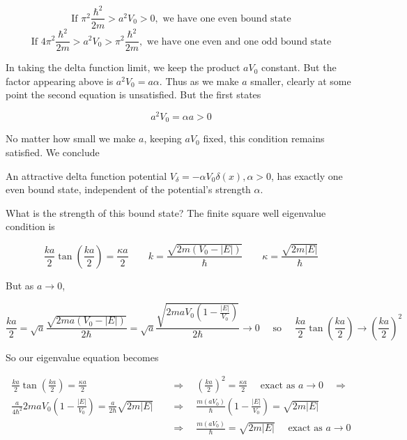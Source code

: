 \[ \text{If } \pi^2 \frac{\hbar^2}{2m} > a^2V_0 > 0, \text{ we have one even
bound state} \]
\[ \text{If } 4\pi^2\frac{\hbar^2}{2m} > a^2V_0 > \pi^2\frac{\hbar^2}{2m},
  \text{ we have one even and one odd bound state} \] \vspace{3px}

In taking the delta function limit, we keep the product $aV_0$ constant. But
the factor appearing above is $a^2V_0 = a\alpha$. Thus as we make $a$ smaller,
clearly at some point the second equation is unsatisfied. But the first states 

\[
a^2V_0 = \alpha a > 0
\] \vspace{3px}

No matter how small we make $a$, keeping $aV_0$ fixed, this condition remains
satisfied. We conclude 

\begin{subbox}{}
  An attractive delta function potential $V_\delta = -\alpha V_0 \delta(x),
  \alpha > 0$, has exactly one even bound state, independent of the potential's
  strength $\alpha$. 
\end{subbox}

What is the strength of this bound state? The finite square well eigenvalue
condition is 

\[
  \frac{ka}{2}\tan \left( \frac{ka}{2} \right) = \frac{\kappa a}{2} \qquad
  k = \frac{\sqrt{2m(V_0 - |E|)}}{\hbar} \qquad \kappa
  = \frac{\sqrt{2m|E|}}{\hbar} 
\] \vspace{3px}

But as $a\rightarrow 0$, 

\[
\frac{ka}{2} = \sqrt{a}\frac{\sqrt{2ma(V_0 - |E|)}}{2\hbar}
= \sqrt{a}\frac{\sqrt{2maV_0(1 - \frac{|E|}{V_0})}}{2\hbar} \rightarrow 0 \quad
\text{ so } \quad \frac{ka}{2}\tan \left( \frac{ka}{2} \right) \rightarrow
\left( \frac{ka}{2} \right) ^2  
\] \vspace{3px}

So our eigenvalue equation becomes 

\begin{align} \label{}
  \frac{ka}{2}\tan\left( \frac{ka}{2} \right) = \frac{\kappa a}{2} \quad
&\Rightarrow \quad \left( \frac{ka}{2} \right) ^2 = \frac{\kappa a }{2} \quad
\text{ exact as } a \rightarrow 0 \quad \Rightarrow \\
  \frac{a}{4\hbar^2}2maV_0 \left( 1 - \frac{|E|}{V_0} \right)
  = \frac{a}{2\hbar}\sqrt{2m|E|} \quad &\Rightarrow \quad
  \frac{m(aV_0)}{\hbar}\left( 1- \frac{|E|}{V_0} \right)  = \sqrt{2m|E|} \\
                                       &\Rightarrow \quad \frac{m(aV_0)}{\hbar}
  = \sqrt{2m|E|} \quad \text{ exact as
                                       } a \rightarrow 0
\end{align}\vspace{3px}

